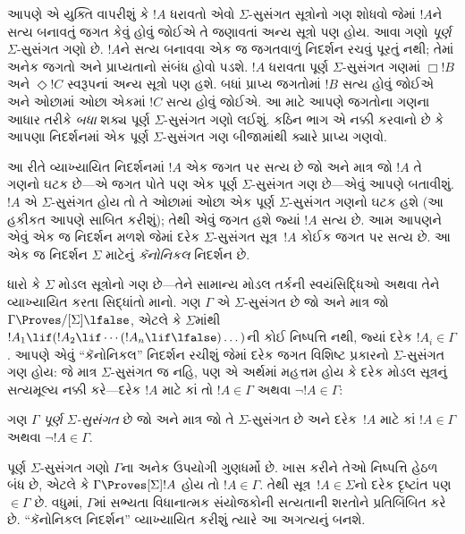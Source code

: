 આપણે એ યુક્તિ વાપરીશું કે $!A$ ધરાવતો એવો $\Sigma$-સુસંગત
સૂત્રોનો ગણ શોધવો જેમાં $!A$ને સત્ય બનાવતું જગત કેવું હોવું
જોઈએ તે જણાવતાં અન્ય સૂત્રો પણ હોય. આવા ગણો \emph{પૂર્ણ}
$\Sigma$-સુસંગત ગણો છે. $!A$ને સત્ય બનાવવા એક જ જગતવાળું નિદર્શન
રચવું પૂરતું નથી; તેમાં અનેક જગતો અને પ્રાપ્યતાનો સંબંધ હોવો પડશે.
$!A$ ધરાવતા પૂર્ણ $\Sigma$-સુસંગત ગણમાં $\Box !B$ અને
$\Diamond !C$ સ્વરૂપનાં અન્ય સૂત્રો પણ હશે. બધાં પ્રાપ્ય
જગતોમાં $!B$ સત્ય હોવું જોઈએ અને ઓછામાં ઓછા એકમાં $!C$ સત્ય
હોવું જોઈએ. આ માટે આપણે જગતોના ગણના આધાર તરીકે \emph{બધા}
શક્ય પૂર્ણ $\Sigma$-સુસંગત ગણો લઈશું. કઠિન ભાગ એ નક્કી કરવાનો
છે કે આપણા નિદર્શનમાં એક પૂર્ણ $\Sigma$-સુસંગત ગણ બીજામાંથી
ક્યારે પ્રાપ્ય ગણવો.

આ રીતે વ્યાખ્યાયિત નિદર્શનમાં $!A$ એક જગત પર સત્ય છે જો અને માત્ર
જો $!A$ તે ગણનો ઘટક છે—એ જગત પોતે પણ એક પૂર્ણ
$\Sigma$-સુસંગત ગણ છે—એવું આપણે બતાવીશું. $!A$ એ
$\Sigma$-સુસંગત હોય તો તે ઓછામાં ઓછા એક પૂર્ણ $\Sigma$-સુસંગત
ગણનો ઘટક હશે (આ હકીકત આપણે સાબિત કરીશું); તેથી એવું
જગત હશે જ્યાં $!A$ સત્ય છે. આમ આપણને એવું એક જ નિદર્શન મળશે જેમાં
દરેક $\Sigma$-સુસંગત સૂત્ર~$!A$ કોઈક જગત પર સત્ય છે.
આ એક જ નિદર્શન $\Sigma$ માટેનું \emph{કૅનોનિકલ} નિદર્શન છે.
\endgroup

\begingroup
\makeatletter{}\makeatother


\label{guunit:OLP-0443}


ધારો કે $\Sigma$ મોડલ સૂત્રોનો ગણ છે—તેને સામાન્ય મોડલ
તર્કની સ્વયંસિદ્ધિઓ અથવા તેને વ્યાખ્યાયિત કરતા સિદ્ધાંતો માનો. ગણ
$\Gamma$ એ $\Sigma$-સુસંગત છે જો અને માત્ર જો $\Gamma
\Proves/[\Sigma] \lfalse$, એટલે કે $\Sigma$માંથી
$!A_1 \lif (!A_2 \lif \cdots (!A_n \lif \lfalse)\dots)$ની કોઈ
નિષ્પત્તિ નથી, જ્યાં દરેક $!A_i \in \Gamma$. આપણે એવું
``કૅનોનિકલ'' નિદર્શન રચીશું જેમાં દરેક જગત વિશિષ્ટ પ્રકારનો
$\Sigma$-સુસંગત ગણ હોય: જે માત્ર $\Sigma$-સુસંગત જ નહિ, પણ એ અર્થમાં
મહત્તમ હોય કે દરેક મોડલ સૂત્રનું સત્યમૂલ્ય નક્કી કરે—દરેક $!A$
માટે કાં તો $!A \in \Gamma$ અથવા $\lnot !A \in \Gamma$:

\begin{defn}
  ગણ $\Gamma$ \emph{પૂર્ણ $\Sigma$-સુસંગત} છે જો અને માત્ર જો તે
  $\Sigma$-સુસંગત છે અને દરેક~$!A$ માટે કાં $!A \in \Gamma$ અથવા
  $\lnot !A \in \Gamma$.
\end{defn}

પૂર્ણ $\Sigma$-સુસંગત ગણો $\Gamma$ના અનેક ઉપયોગી ગુણધર્મો છે.
ખાસ કરીને તેઓ નિષ્પત્તિ હેઠળ બંધ છે, એટલે કે $\Gamma
\Proves[\Sigma] !A$ હોય તો $!A \in \Gamma$. તેથી
સૂત્ર~$!A \in \Sigma$નો દરેક દૃષ્ટાંત પણ
$\in \Gamma$ છે. વધુમાં, $\Gamma$માં સભ્યતા વિધાનાત્મક સંયોજકોની
સત્યતાની શરતોને પ્રતિબિંબિત કરે છે. ``કૅનોનિકલ નિદર્શન'' વ્યાખ્યાયિત
કરીશું ત્યારે આ અગત્યનું બનશે.

